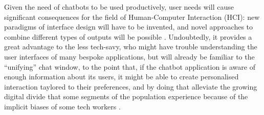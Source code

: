 Given the need of chatbots to be used productively, user needs will cause significant consequences for the field of Human-Computer Interaction (HCI): new paradigms of interface design will have to be invented, and novel approaches to combine different types of outputs will be possible \cite{Følstad2017}. Undoubtedly, it provides a great advantage to the less tech-savy, who might have trouble understanding the user interfaces of many bespoke applications, but will already be familiar to the ``unifying'' chat window, to the point that, if the chatbot application is aware of enough information about its users, it might be able to create personalised interaction taylored to their preferences, and by doing that alleviate the growing digital divide that some segments of the population experience because of the implicit biases of some tech workers \cite{Brandtzaeg2011}.


